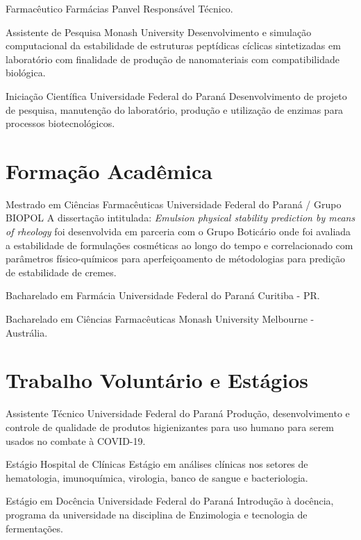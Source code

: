 {Farmacêutico}
{Farmácias Panvel}
{Responsável Técnico.}

{Assistente de Pesquisa}
{Monash University}
{Desenvolvimento e simulação computacional da estabilidade 
de estruturas peptídicas cíclicas sintetizadas em laboratório 
com finalidade de produção de nanomateriais com compatibilidade biológica.}

{Iniciação Científica}
{Universidade Federal do Paraná}
{Desenvolvimento de projeto de pesquisa, 
manutenção do laboratório, 
produção e utilização de enzimas para processos biotecnológicos.}

\section{Formação Acadêmica}

{Mestrado em Ciências Farmacêuticas}
{Universidade Federal do Paraná / Grupo BIOPOL}
{A dissertação intitulada: \emph{Emulsion physical stability prediction by means of rheology}
foi desenvolvida em parceria com o Grupo Boticário onde foi avaliada a estabilidade
de formulações cosméticas ao longo do tempo e correlacionado com parâmetros 
físico-químicos para aperfeiçoamento de métodologias para predição de estabilidade de cremes.}

{Bacharelado em Farmácia}
{Universidade Federal do Paraná}
{Curitiba - PR.}

{Bacharelado em Ciências Farmacêuticas}
{Monash University}
{Melbourne - Austrália.}

\section{Trabalho Voluntário e Estágios}

{Assistente Técnico}
{Universidade Federal do Paraná}
{Produção, desenvolvimento e controle de qualidade de produtos higienizantes 
para uso humano para serem usados no combate à COVID-19.}

{Estágio}
{Hospital de Clínicas}
{Estágio em análises clínicas nos setores de hematologia, 
imunoquímica, virologia, banco de sangue e bacteriologia.}

{Estágio em Docência}
{Universidade Federal do Paraná}
{Introdução à docência, programa da universidade 
na disciplina de Enzimologia e tecnologia de fermentações.}

